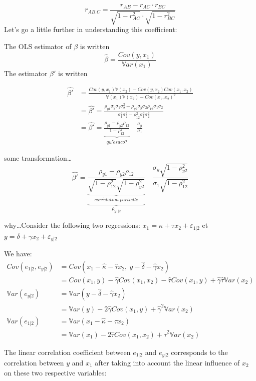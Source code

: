 \documentclass[
]{report}
\begin{document}
\[r_{AB.C}=\frac{r_{AB}-r_{AC} \cdot r_{BC}}{\sqrt{1-r_{AC}^2} \cdot \sqrt{1-r_{BC}^2}}\]
Let's go a little further in understanding this coefficient:

The OLS estimator of \(\beta\) is written
\[\hat{\beta}=\frac{Cov(y,x_1)}{\mathbb{V}ar(x_1)}\]
The estimator \(\beta'\) is written

\begin{align*}
\hat{\beta'} &= \frac{Cov(y,x_1)\mathbb{V}(x_2)-Cov(y,x_2)Cov(x_1,x_2)}{
\mathbb{V}(x_1)\mathbb{V}(x_2)-Cov(x_1,x_2)^2} \\
&= \hat{\beta'}=\frac{\rho_{y1} \sigma_y \sigma_1\sigma_2^2-\rho_{y2} \sigma_y \sigma_2\rho_{12} \sigma_1 \sigma_2}{\sigma_1^2\sigma_2^2-\rho_{12}^2 \sigma_1^2 \sigma_2^2} \\
&= \hat{\beta'}=\underbrace{\frac{\rho_{y1}-\rho_{y2}\rho_{12}} 
{1-\rho_{12}^2}}_{qu'\grave{e}saco ?}\quad\frac{\sigma_y}{\sigma_1}
\end{align*}

some transformation\ldots{}
\[\hat{\beta'}=\underbrace{\underbrace{\frac{\rho_{y1}-\rho_{y2}\rho_{12}} 
{\sqrt{1-\rho_{12}^2}\sqrt{1-\rho_{y2}^2}}}_{corr\acute{e}lation ~partielle}}_{\rho_{y1|2}}
\quad\frac{\sigma_y\sqrt{1-\rho_{y2}^2}}{\sigma_1\sqrt{1-\rho_{12}^2}}\]

why\ldots Consider the following two regressions:
\(x_1=\kappa +\tau x_2+\varepsilon_{1|2}\) et \(y=\delta +\gamma x_2+\varepsilon_{y|2}\)

We have:
\begin{align*}
Cov(e_{1|2},e_{y|2})&=Cov(x_1-\hat{\kappa}-\hat{\tau} x_2,~y-\hat{\delta} -\hat{\gamma} x_2)\\
&=Cov(x_1,y)-\hat{\gamma}Cov(x_1,x_2)-\hat{\tau}Cov(x_1,y)+\hat{\gamma}\hat{\tau}\mathbb{V}ar(x_2)\\
\mathbb{V}ar(e_{y|2})&=\mathbb{V}ar(y-\hat{\delta} - \hat{\gamma} x_2)\\
&=\mathbb{V}ar(y)-2\hat{\gamma}Cov(x_1,y)+\hat{\gamma}^2\mathbb{V}ar(x_2)\\
\mathbb{V}ar(e_{1|2})&=\mathbb{V}ar(x_1-\hat{\kappa} - \hat{\tau} x_2)\\
&=\mathbb{V}ar(x_1)-2\hat{\tau}Cov(x_1,x_2)+\hat{\tau}^2\mathbb{V}ar(x_2)
\end{align*}

The linear correlation coefficient between \(e_{1|2}\) and \(e_{y|2}\) corresponds to the correlation between \(y\) and \(x_1\) after taking into account the linear influence of \(x_2\) on these two respective variables:
\end{document}
